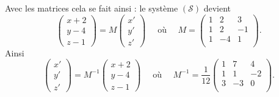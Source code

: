 {\begin{enumerate}
{\bigskip

Avec les matrices cela se fait ainsi :
le système $(\mathcal{S})$ devient
$$\begin{pmatrix} x+2 \\ y-4 \\ z-1 \end{pmatrix}= M \begin{pmatrix} x' \\ y' \\ z' \end{pmatrix}
\quad \text{ où } \quad 
M = \begin{pmatrix}
     1 & 2 & 3 \\ 1 & 2 & -1 \\ 1 & -4 & 1 \\
    \end{pmatrix}.
$$
Ainsi
$$\begin{pmatrix} x' \\ y' \\ z' \end{pmatrix}= M^{-1} \begin{pmatrix} x+2 \\ y-4 \\ z-1 \end{pmatrix}
\quad \text{ où } \quad 
M^{-1} = \frac{1}{12}\begin{pmatrix}
     1 & 7 & 4 \\ 1 & 1 & -2 \\ 3 & -3 & 0 \\
    \end{pmatrix}.
$$}
\end{enumerate}
}
